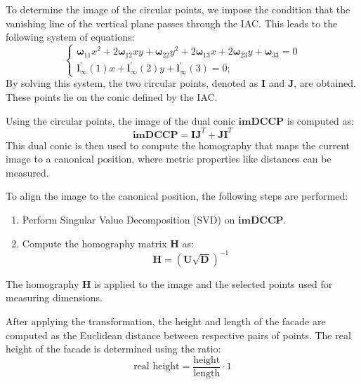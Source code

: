 \documentclass{Academic}
\begin{document}
To determine the image of the circular points, we impose the condition that the vanishing line of the vertical plane passes through the IAC. 
This leads to the following system of equations:
\begin{equation}
\label{eqn:iac2}
\begin{cases}
    \boldsymbol{\omega}_{11} x^2 + 2  \boldsymbol{\omega}_{12}  x  y + \boldsymbol{\omega}_{22}  y^2 + 2  \boldsymbol{\omega}_{13} x + 2  \boldsymbol{\omega}_{23}  y + \boldsymbol{\omega}_{33} = 0 \\ 
    \mathbf{l}_{\infty}^\prime(1)  x + \mathbf{l}_{\infty}^\prime(2)  y + \mathbf{l}_{\infty}^\prime(3) = 0;
\end{cases}\end{equation}
By solving this system, the two circular points, denoted as $\mathbf{I}$ and  $\mathbf{J}$, are obtained. 
These points lie on the conic defined by the IAC.

Using the circular points, the image of the dual conic $\mathbf{imDCCP}$ is computed as: 
\begin{equation}\mathbf{imDCCP}=\mathbf{IJ}^T+\mathbf{JI}^T\end{equation}
\noindent This dual conic is then used to compute the homography that maps the current image to a canonical position, where metric properties like distances can be measured.

\noindent To align the image to the canonical position, the following steps are performed:
\begin{enumerate}
    \item Perform Singular Value Decomposition (SVD) on $\mathbf{imDCCP}$.
    \item Compute the homography matrix $\mathbf{H}$ as:
        \begin{equation}\mathbf{H}=\left(\mathbf{U}\sqrt{\mathbf{D}}\right)^{-1}\end{equation}
\end{enumerate}
The homography $\mathbf{H}$ is applied to the image and the selected points used for measuring dimensions.

After applying the transformation, the height and length of the facade are computed as the Euclidean distance between respective pairs of points. 
The real height of the facade is determined using the ratio:
\begin{equation}\text{real height}=\dfrac{\text{height}}{\text{length}} \cdot 1 \end{equation}
\end{document}
